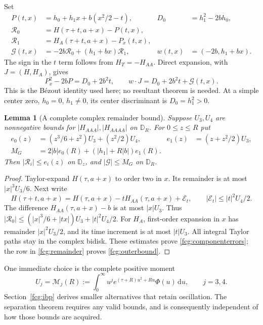 \documentclass[11pt]{article}
\numberwithin{equation}{section}
\newtheorem{lemma}[theorem]{Lemma}
\newcommand{\dd}{\,\mathrm d}
\begin{document}
Set
\begin{align}
 P(t,x)&=h_0+h_1x+b(x^2/2-t),&
 D_0&=h_1^2-2bh_0,\label{fcg:polynomial}\\
 \mathcal R_0&=H(\tau+t,a+x)-P(t,x),\nonumber\\
 \mathcal R_1&=H_A(\tau+t,a+x)-P_x(t,x),\nonumber\\
 \mathcal G(t,x)&=-2b\mathcal R_0+(h_1+bx)\mathcal R_1,&
 w(t,x)&=(-2b,h_1+bx).\label{fcg:remainder}
\end{align}
The sign in the $t$ term follows from $H_T=-H_{AA}$.
Direct expansion, with $J=(H,H_A)$, gives
\begin{equation}\label{fcg:bezout}
 P_x^2-2bP=D_0+2b^2t,\qquad
 w\cdot J=D_0+2b^2t+\mathcal G(t,x).
\end{equation}
This is the B\'ezout identity used here; no resultant theorem is
needed. At a simple center zero, $h_0=0$, $h_1\ne0$, its center
discriminant is $D_0=h_1^2>0$.

\begin{lemma}[A complete complex remainder bound]
\label{fcg:complexremainder}
Suppose $U_3,U_4$ are nonnegative bounds for $|H_{AAA}|,|H_{AAAA}|$
on $\mathbb D_R$. For $0\le z\le R$ put
\begin{align}
 e_0(z)&=(z^3/6+z^2)U_3+(z^2/2)U_4,&
 e_1(z)&=(z+z^2/2)U_3,\label{fcg:componenterrors}\\
 M_G&=2|b|e_0(R)+(|h_1|+R|b|)e_1(R).\label{fcg:outerbound}
\end{align}
Then $|\mathcal R_i|\le e_i(z)$ on $\mathbb D_z$, and
$|\mathcal G|\le M_G$ on $\mathbb D_R$.
\end{lemma}
\begin{proof}
Taylor-expand $H(\tau,a+x)$ to order two in $x$. Its remainder is
at most $|x|^3U_3/6$. Next write
\[
 H(\tau+t,a+x)=H(\tau,a+x)-tH_{AA}(\tau,a+x)
                         +\mathcal E_t,
 \qquad |\mathcal E_t|\le |t|^2U_4/2.
\]
The difference $H_{AA}(\tau,a+x)-b$ is at most $|x|U_3$.
Thus $|\mathcal R_0|\le(|x|^3/6+|tx|)U_3+|t|^2U_4/2$.
For $H_A$, first-order expansion in $x$ has remainder
$|x|^2U_3/2$, and its time increment is at most $|t|U_3$.
All integral Taylor paths stay in the complex bidisk. These estimates
prove \eqref{fcg:componenterrors}; the row in
\eqref{fcg:remainder} proves \eqref{fcg:outerbound}.
\end{proof}

One immediate choice is the complete positive moment
\begin{equation}\label{fcg:plainmoments}
 U_j=\mathcal M_j(R):=
 \int_0^\infty u^j e^{(\tau+R)u^2+Ru}\Phi(u)\dd u,
 \qquad j=3,4.
\end{equation}
Section~\ref{fcg:ibp} derives smaller alternatives that retain
oscillation. The separation theorem requires any valid bounds, and
is consequently independent of how those bounds are acquired.
\end{document}
